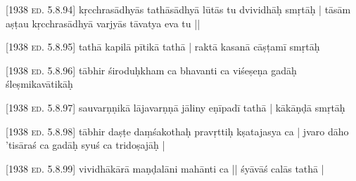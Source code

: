 \documentclass[14pt]{book}
\newcommand*{\caesura}{\linebreak}
\begin{document}
 
\pstart

                         \textsc{[1938 ed. 5.8.94]}
                        \caesura kṛcchrasādhyās tathāsādhyā lūtās tu dvividhāḥ smṛtāḥ | \caesura tāsām aṣṭau kṛcchrasādhyā varjyās tāvatya eva tu || 
\pend

 
\pstart

                         \textsc{[1938 ed. 5.8.95]}
                        \caesura {} tathā  kapilā pītikā tathā | \caesura {} raktā kasanā cāṣṭamī smṛtāḥ 
\pend

 
\pstart

                         \textsc{[1938 ed. 5.8.96]}
                        \caesura tābhir  śiroduḥkham    ca \edtext{| \caesura}{
  \Afootnote{\textsc{[add]} vedanā |  A.}
} bhavanti ca viśeṣeṇa gadāḥ śleṣmikavātikāḥ 
\pend

 
\pstart

                         \textsc{[1938 ed. 5.8.97]}
                        \caesura sauvarṇṇikā lājavarṇṇā jāliny eṇīpadī tathā | \caesura {} kākāṇḍā   smṛtāḥ 
\pend

 
\pstart

                         \textsc{[1938 ed. 5.8.98]}
                        \caesura tābhir daṣṭe daṃśakothaḥ pravṛttiḥ kṣatajasya ca | \caesura jvaro dāho 'tisāraś ca gadāḥ syuś ca tridoṣajāḥ | 
\pend

 
\pstart

                         \textsc{[1938 ed. 5.8.99]}
                        \caesura {} vividhākārā maṇḍalāni mahānti ca || \caesura {}    śyāvāś calās tathā | 
\pend
\end{document}
